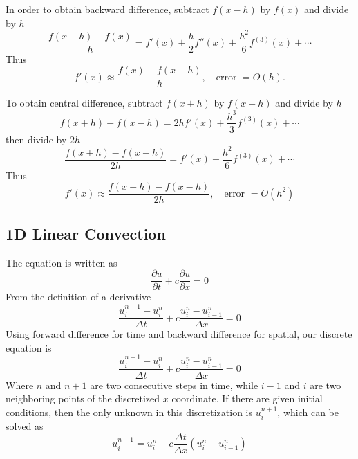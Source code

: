 \documentclass[../../../main.tex]{subfiles}
\begin{document}
In order to obtain backward difference, subtract $f(x-h)$ by $f(x)$ and divide by $h$
\begin{equation*}
    \frac{f(x+h) - f(x)}{h} = f'(x) + \frac{h}{2} f''(x) + \frac{h^2}{6} f^{(3)}(x) +\cdots
\end{equation*}
Thus
\begin{equation*}
    f'(x) \approx \frac{f(x) - f(x-h)}{h}, \quad \text{error } = O(h).
\end{equation*}

To obtain central difference, subtract $f(x+h)$ by $f(x-h)$ and divide by $h$
\begin{equation*}
    f(x+h) - f(x-h) = 2h f'(x) + \frac{h^3}{3} f^{(3)}(x) +\cdots
\end{equation*}
then divide by $2h$
\begin{equation*}
    \frac{f(x+h) - f(x-h)}{2h} = f'(x) + \frac{h^2}{6} f^{(3)}(x) +\cdots
\end{equation*}
Thus
\begin{equation*}
    f'(x) \approx \frac{f(x+h) - f(x-h)}{2h}, \quad \text{error } = O(h^2)
\end{equation*}

\subsection{1D Linear Convection}
The equation is written as
\begin{equation*}
    \frac{\partial u}{\partial t} + c \frac{\partial u}{\partial x} = 0
\end{equation*}
From the definition of a derivative
\begin{equation*}
    \frac{u_i^{n+1}-u_i^n}{\Delta t} + c \frac{u_i^n - u_{i-1}^n}{\Delta x} = 0
\end{equation*}
Using forward difference for time and backward difference for spatial, our discrete equation is
\begin{equation*}
    \frac{u_i^{n+1}-u_i^n}{\Delta t} + c \frac{u_i^n - u_{i-1}^n}{\Delta x} = 0
\end{equation*}
Where $n$ and $n+1$ are two consecutive steps in time, while $i-1$ and $i$ are two neighboring points of the discretized $x$ coordinate.
If there are given initial conditions, then the only unknown in this discretization is $u_i^{n+1}$, which can be solved as
\begin{equation*}
    u_i^{n+1} = u_i^n - c \frac{\Delta t}{\Delta x}(u_i^n-u_{i-1}^n)
\end{equation*}
\end{document}
